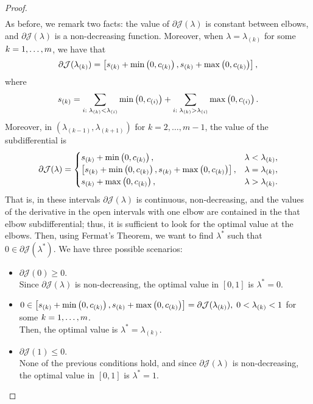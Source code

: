 \begin{proof}
\begin{equation}
\begin{aligned}
        \end{aligned}        
    \end{equation}
    As before, we remark two facts: the value of $\partial \mathcal{J}(\lambda)$ is constant between elbows, and $\partial \mathcal{J}(\lambda)$ is a non-decreasing function.
    Moreover, when $\lambda = \lambda_{(k)}$ for some $k=1, \ldots, m$, we have that
    \begin{equation}
        \nonumber
        \partial \mathcal{J}(\lambda_{(k)}) = \left[ s_{(k)} + \min\left(0, c_{(k)}\right), s_{(k)} + \max\left(0, c_{(k)}\right)  \right] ,
    \end{equation}
    where $$s_{(k)} = \sum_{i: \; \lambda_{(k)} < \lambda_{(i)}} \min\left(0, c_{(i)}\right) + \sum_{i: \; \lambda_{(k)} > \lambda_{(i)}} \max\left(0, c_{(i)}\right).$$
    Moreover, in $(\lambda_{(k-1)}, \lambda_{(k+1)})$ for $k=2, \ldots, m-1$, the value of the subdifferential is
    \begin{equation}
        \nonumber
        \partial \mathcal{J}(\lambda) = \begin{cases}
            s_{(k)} + \min\left(0, c_{(k)}\right),& \lambda < \lambda_{(k)}, \\
            \left[ s_{(k)} + \min\left(0, c_{(k)}\right), s_{(k)} + \max\left(0, c_{(k)}\right)   \right],& \lambda = \lambda_{(k)}, \\
            s_{(k)} + \max\left(0, c_{(k)}\right),& \lambda > \lambda_{(k)} .
        \end{cases}
    \end{equation}
    That is, in these intervals $\partial \mathcal{J}(\lambda)$ is continuous, non-decreasing, and the values of the derivative in the open intervals with one elbow are contained in the that elbow subdifferential; thus, it is sufficient to look for the optimal value at the elbows.
    Then, using Fermat's Theorem, we want to find $\lambda^*$ such that $0 \in \partial \mathcal{J}(\lambda^*)$. We have three possible scenarios:
    \begin{itemize}
        \item $\partial \mathcal{J}(0) \geq 0.$ 
        \\Since $\partial \mathcal{J}(\lambda)$ is non-decreasing, the optimal value in $[0, 1]$ is $\lambda^* = 0$.
        \item $0 \in \left[ s_{(k)} + \min\left(0, c_{(k)}\right), s_{(k)} + \max\left(0, c_{(k)}\right)   \right] = \partial \mathcal{J}(\lambda_{(k)}), \; 0 < \lambda_{(k)} < 1$ for some $k=1, \ldots, m$. 
        \\Then, the optimal value is $\lambda^*=\lambda_{(k)}$.
        \item $\partial \mathcal{J}(1) \leq 0$. 
        \\None of the previous conditions hold, and since $\partial \mathcal{J}(\lambda)$ is non-decreasing, the optimal value in $[0, 1]$ is $\lambda^* = 1$.
    \end{itemize}
\end{proof}
